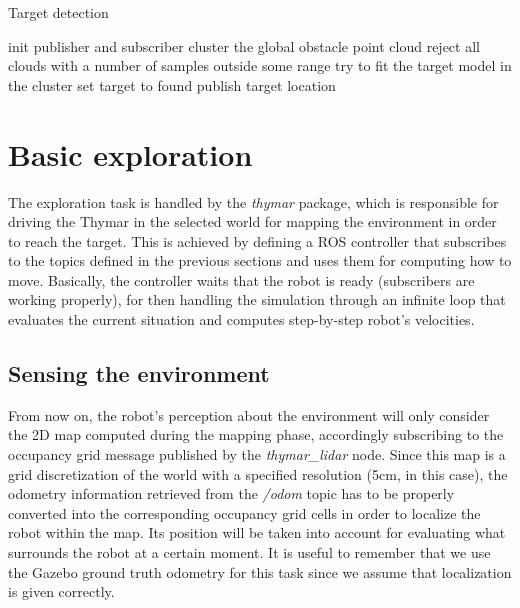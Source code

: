 \documentclass[9pt,conference]{IEEEtran}
\begin{document}
\begin{algorithm}
\caption{Target detection}
\label{code:target_detection}
\begin{algorithmic}
\STATE init publisher and subscriber
\STATE cluster the global obstacle point cloud
\STATE reject all clouds with a number of samples outside some range
\STATE try to fit the target model in the cluster
\STATE set target to found
\STATE publish target location
\ENDIF
\ENDFOR
\ENDIF
\ENDWHILE 
\end{algorithmic}
\end{algorithm}




\section{Basic exploration}
\label{sec:basic-exploration}

The exploration task is handled by the \textit{thymar} package, which is responsible for driving the Thymar in the selected world for mapping the environment in order to reach the target. This is achieved by defining a ROS controller that subscribes to the topics defined in the previous sections and uses them for computing how to move. Basically, the controller waits that the robot is ready (subscribers are working properly), for then handling the simulation through an infinite loop that evaluates the current situation and computes step-by-step robot's velocities.


\subsection{Sensing the environment}

From now on, the robot's perception about the environment will only consider the 2D map computed during the mapping phase, accordingly subscribing to the occupancy grid message published by the \textit{thymar\_lidar} node. Since this map is a grid discretization of the world with a specified resolution (5cm, in this case), the odometry information retrieved from the \textit{/odom} topic has to be properly converted into the corresponding occupancy grid cells in order to localize the robot within the map. Its position will be taken into account for evaluating what surrounds the robot at a certain moment. It is useful to remember that we use the Gazebo ground truth odometry for this task since we assume that localization is given correctly.
\end{document}
